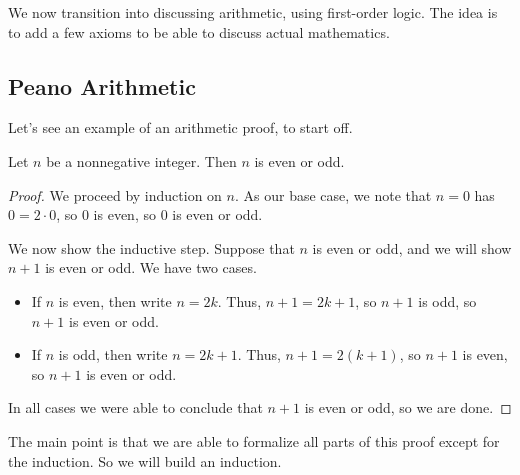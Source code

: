 \documentclass[../notes.tex]{subfiles}
\begin{document}

We now transition into discussing arithmetic, using first-order logic. The idea is to add a few axioms to be able to discuss actual mathematics.

\subsection{Peano Arithmetic}
Let's see an example of an arithmetic proof, to start off.
\begin{lemma}
	Let $n$ be a nonnegative integer. Then $n$ is even or odd.
\end{lemma}
\begin{proof}
	We proceed by induction on $n$. As our base case, we note that $n=0$ has $0=2\cdot0$, so $0$ is even, so $0$ is even or odd.

	We now show the inductive step. Suppose that $n$ is even or odd, and we will show $n+1$ is even or odd. We have two cases.
	\begin{itemize}
		\item If $n$ is even, then write $n=2k$. Thus, $n+1=2k+1$, so $n+1$ is odd, so $n+1$ is even or odd.
		\item If $n$ is odd, then write $n=2k+1$. Thus, $n+1=2(k+1)$, so $n+1$ is even, so $n+1$ is even or odd.
	\end{itemize}
	In all cases we were able to conclude that $n+1$ is even or odd, so we are done.
\end{proof}
The main point is that we are able to formalize all parts of this proof except for the induction. So we will build an induction.
\end{document}
